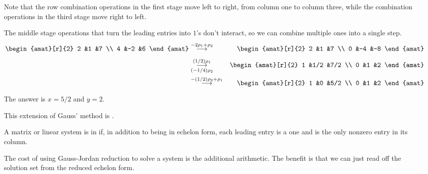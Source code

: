 Note that the row combination operations in the first stage move left to right,
from column one to column three, 
while the combination operations in the third stage move right to left.

\begin{example}  \label{exm:GJRedReadOffSolTwo}
The middle stage operations that 
turn the leading entries into \( 1 \)'s
don't interact, so we can combine multiple ones into a single step.
\begin{eqnarray*}
    \begin{amat}[r]{2}
       2   &1   &7   \\
       4   &-2  &6
    \end{amat}
  &\grstep{-2\rho_1+\rho_2}
  &\begin{amat}[r]{2}
       2   &1   &7   \\
       0   &-4  &-8
    \end{amat}                                   \\
  &\grstep[(-1/4)\rho_2]{(1/2)\rho_1}
  &\begin{amat}[r]{2}
       1   &1/2   &7/2   \\
       0   &1     &2
    \end{amat}                                    \\
  &\grstep{-(1/2)\rho_2+\rho_1}
  &\begin{amat}[r]{2}
       1   &0   &5/2   \\
       0   &1   &2
    \end{amat}
\end{eqnarray*}
The answer is $x=5/2$ and $y=2$.
\end{example}

This extension of Gauss' method is 
.

\begin{definition}\label{def:RedEchForm}
A matrix or linear system is in
if, in addition to being in echelon form, each leading entry is a
one and is the only nonzero entry in its column.
\end{definition}

\noindent
The cost of using Gauss-Jordan reduction to solve a system 
is the additional arithmetic.
The benefit is that we can just read off the solution set
from the reduced echelon form.

